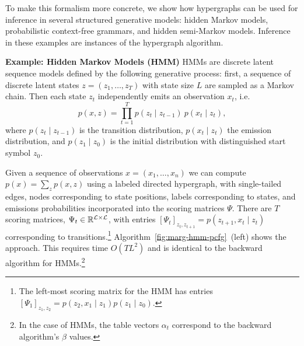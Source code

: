 \documentclass{article}
\begin{document}
To make this formalism more concrete, we show how hypergraphs can be used for inference in several structured generative models: hidden Markov models,  probabilistic context-free grammars, and hidden semi-Markov models.
Inference in these examples are instances of the hypergraph algorithm.

\textbf{Example: Hidden Markov Models (HMM)}
HMMs are discrete latent sequence models defined by the following generative process: first, a sequence of discrete latent states $z = (z_1, \ldots,z_T)$ with state size $L$ are sampled as a Markov chain. Then each state $z_t$ independently emits an observation $x_t$, i.e. 
\begin{equation}
\label{eqn:hmm}
    p(x,z) = \prod_{t=1}^T p(z_t \mid z_{t-1})\ p(x_t\mid z_t),
\end{equation}
where $p(z_t \mid z_{t-1})$ is the transition distribution,
 $p(x_t \mid z_t)$ the emission distribution, and $p(z_1 \mid z_0)$ is the initial distribution with distinguished start symbol $z_0$.

Given a sequence of observations $x=(x_1, \ldots, x_n)$ we can compute
$p(x) = \sum_zp(x,z)$ using a labeled directed hypergraph, with single-tailed edges, nodes corresponding to state positions, labels corresponding to states, and emissions probabilities incorporated into the scoring matrices $\Psi$.
There are $T$ scoring matrices, $\Psi_t\in\mathbb{R}^{\mathcal{L}\times\mathcal{L}}$, with entries $[\Psi_t]_{z_t,z_{t+1}} = p(z_{t+1},x_t \mid z_t)$ corresponding to transitions.\footnote{
The left-most scoring matrix for the HMM has entries $[\Psi_1]_{z_1,z_{2}} = p(z_{2},x_1 \mid z_1)p(z_1\mid z_0)$.
}
Algorithm~\ref{fig:marg-hmm-pcfg}~(left) shows the approach. This requires time $O(TL^2)$ and is identical to the backward algorithm for HMMs.\footnote{
In the case of HMMs, the table vectors $\alpha_t$ correspond to the backward algorithm's $\beta$ values.}
\end{document}
